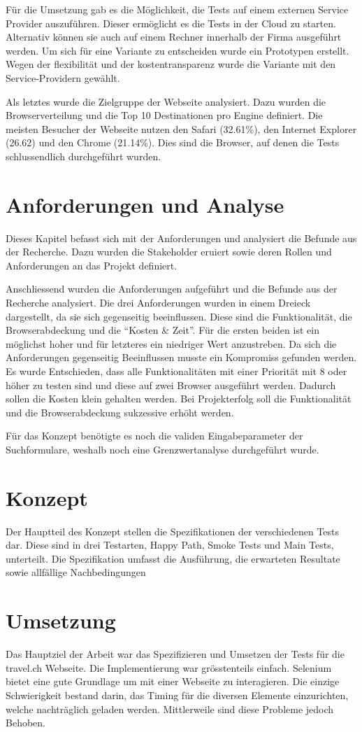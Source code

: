 Für die Umsetzung gab es die Möglichkeit, die Tests auf einem externen Service Provider auszuführen. Dieser ermöglicht es die Tests in der Cloud zu starten. Alternativ können sie auch auf einem Rechner innerhalb der Firma ausgeführt werden. Um sich für eine Variante zu entscheiden wurde ein Prototypen erstellt. Wegen der flexibilität und der kostentransparenz wurde die Variante mit den Service-Providern gewählt.

Als letztes wurde die Zielgruppe der Webseite analysiert. Dazu wurden die Browserverteilung und die Top 10 Destinationen pro Engine definiert. Die meisten Besucher der Webseite nutzen den Safari (32.61\%), den Internet Explorer (26.62) und den Chrome (21.14\%). Dies sind die Browser, auf denen die Tests schlussendlich durchgeführt wurden.

\section{Anforderungen und Analyse}
Dieses Kapitel befasst sich mit der Anforderungen und analysiert die Befunde aus der Recherche. Dazu wurden die Stakeholder eruiert sowie deren Rollen und Anforderungen an das Projekt definiert.

Anschliessend wurden die Anforderungen aufgeführt und die Befunde aus der Recherche analysiert. Die drei Anforderungen wurden in einem Dreieck dargestellt, da sie sich gegenseitig beeinflussen. Diese sind die Funktionalität, die Browserabdeckung und die "`Kosten \& Zeit"'. Für die ersten beiden ist ein möglichst hoher und für letzteres ein niedriger Wert anzustreben. Da sich die Anforderungen gegenseitig Beeinflussen musste ein Kompromiss gefunden werden. Es wurde Entschieden, dass alle Funktionalitäten mit einer Priorität mit 8 oder höher zu testen sind und diese auf zwei Browser ausgeführt werden. Dadurch sollen die Kosten klein gehalten werden. Bei Projekterfolg soll die Funktionalität und die Browserabdeckung sukzessive erhöht werden.

Für das Konzept benötigte es noch die validen Eingabeparameter der Suchformulare, weshalb noch eine Grenzwertanalyse durchgeführt wurde. 

\section{Konzept}
Der Hauptteil des Konzept stellen die Spezifikationen der verschiedenen Tests dar. Diese sind in drei Testarten, Happy Path, Smoke Tests und Main Tests, unterteilt. Die Spezifikation umfasst die Ausführung, die erwarteten Resultate sowie allfällige Nachbedingungen


\section{Umsetzung}
Das Hauptziel der Arbeit war das Spezifizieren und Umsetzen der Tests für die travel.ch Webseite. Die Implementierung war grösstenteils einfach. Selenium bietet eine gute Grundlage um mit einer Webseite zu interagieren. Die einzige Schwierigkeit bestand darin, das Timing für die diversen Elemente einzurichten, welche nachträglich geladen werden. Mittlerweile sind diese Probleme jedoch Behoben.



